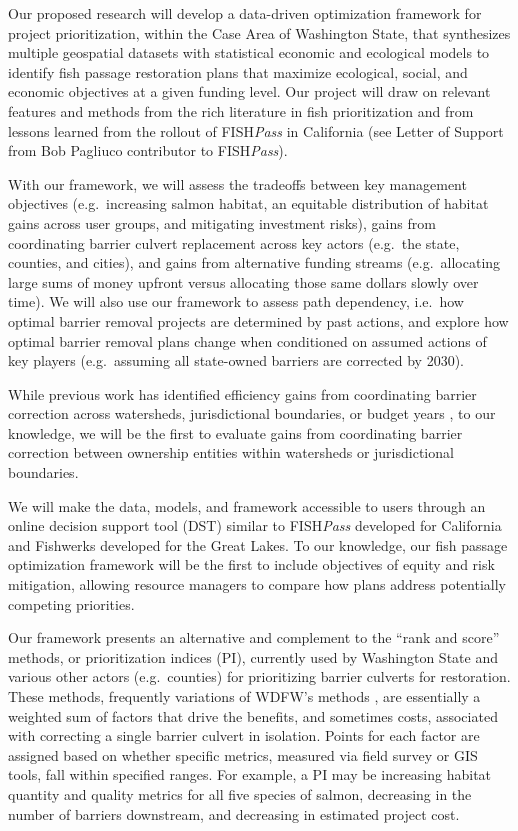 Our proposed research will develop a data-driven optimization framework for project prioritization, within the Case Area of Washington State, that synthesizes multiple geospatial datasets with statistical economic and ecological models to identify fish passage restoration plans that maximize ecological, social, and economic objectives at a given funding level. Our project will draw on relevant features and methods from the rich literature in fish prioritization and from lessons learned from the rollout of FISH\emph{Pass} in California (see Letter of Support from Bob Pagliuco contributor to FISH\emph{Pass}).

With our framework, we will assess the tradeoffs between key management objectives (e.g.\ increasing salmon habitat, an equitable distribution of habitat gains across user groups, and mitigating investment risks), gains from coordinating barrier culvert replacement across key actors (e.g.\ the state, counties, and cities), and gains from alternative funding streams (e.g.\ allocating large sums of money upfront versus allocating those same dollars slowly over time). We will also use our framework to assess path dependency, i.e.\ how optimal barrier removal projects are determined by past actions, and explore how optimal barrier removal plans change when conditioned on assumed actions of key players (e.g.\ assuming all state-owned barriers are corrected by 2030).

While previous work has identified efficiency gains from coordinating barrier correction across watersheds, jurisdictional boundaries, or budget years \citep{neeson_enhancing_2015,milt_local-scale_2017}, to our knowledge, we will be the first to evaluate gains from coordinating barrier correction between ownership entities within watersheds or jurisdictional boundaries. %

We will make the data, models, and framework accessible to users through an online decision support tool (DST) similar to FISH\emph{Pass} developed for California and Fishwerks developed for the Great Lakes. To our knowledge, our fish passage optimization framework will be the first to include objectives of equity and risk mitigation, allowing resource managers to compare how plans address potentially competing priorities. 

Our framework presents an alternative and complement to the ``rank and score'' methods, or prioritization indices (PI), currently used by Washington State and various other actors (e.g.\ counties) for prioritizing barrier culverts for restoration. These methods, frequently variations of WDFW's methods \citep{noauthor_fish_2019}, are essentially a weighted sum of factors that drive the benefits, and sometimes costs, associated with correcting a single barrier culvert in isolation. Points for each factor are assigned based on whether specific metrics, measured via field survey or GIS tools, fall within specified ranges. For example, a PI may be increasing habitat quantity and quality metrics for all five species of salmon, decreasing in the number of barriers downstream, and decreasing in estimated project cost. 

